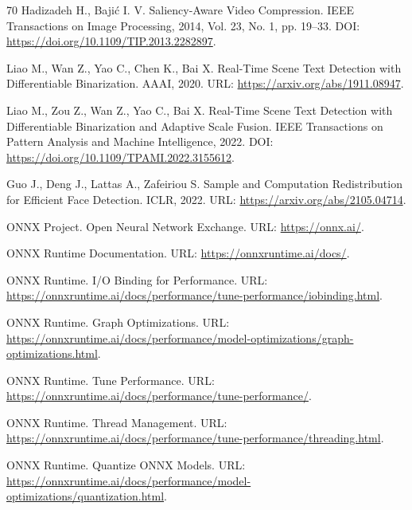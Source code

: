 \documentclass[12pt,a4paper,oneside,openany]{report}
\begin{document}
\begin{thebibliography}{70}
Hadizadeh H., Bajić I. V.
Saliency-Aware Video Compression.
IEEE Transactions on Image Processing, 2014, Vol. 23, No. 1, pp. 19--33.
DOI: \url{https://doi.org/10.1109/TIP.2013.2282897}.


Liao M., Wan Z., Yao C., Chen K., Bai X.
Real-Time Scene Text Detection with Differentiable Binarization.
AAAI, 2020.
URL: \url{https://arxiv.org/abs/1911.08947}.

Liao M., Zou Z., Wan Z., Yao C., Bai X.
Real-Time Scene Text Detection with Differentiable Binarization and Adaptive Scale Fusion.
IEEE Transactions on Pattern Analysis and Machine Intelligence, 2022.
DOI: \url{https://doi.org/10.1109/TPAMI.2022.3155612}.

Guo J., Deng J., Lattas A., Zafeiriou S.
Sample and Computation Redistribution for Efficient Face Detection.
ICLR, 2022.
URL: \url{https://arxiv.org/abs/2105.04714}.


ONNX Project.
Open Neural Network Exchange.
URL: \url{https://onnx.ai/}.

ONNX Runtime Documentation.
URL: \url{https://onnxruntime.ai/docs/}.

ONNX Runtime.
I/O Binding for Performance.
URL: \url{https://onnxruntime.ai/docs/performance/tune-performance/iobinding.html}.

ONNX Runtime.
Graph Optimizations.
URL: \url{https://onnxruntime.ai/docs/performance/model-optimizations/graph-optimizations.html}.

ONNX Runtime.
Tune Performance.
URL: \url{https://onnxruntime.ai/docs/performance/tune-performance/}.

ONNX Runtime.
Thread Management.
URL: \url{https://onnxruntime.ai/docs/performance/tune-performance/threading.html}.

ONNX Runtime.
Quantize ONNX Models.
URL: \url{https://onnxruntime.ai/docs/performance/model-optimizations/quantization.html}.


\end{thebibliography}
\end{document}
